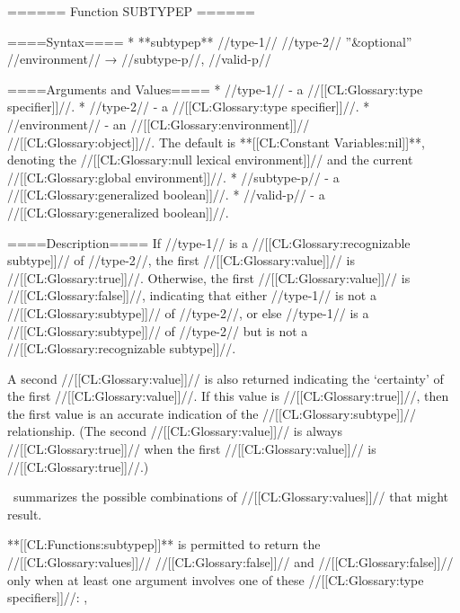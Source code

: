 ====== Function SUBTYPEP ======

====Syntax====
  * **subtypep** //type-1// //type-2// ''&optional'' //environment// → //subtype-p//, //valid-p//

====Arguments and Values====
  * //type-1// - a //[[CL:Glossary:type specifier]]//.
  * //type-2// - a //[[CL:Glossary:type specifier]]//.
  * //environment// - an //[[CL:Glossary:environment]]// //[[CL:Glossary:object]]//. The default is **[[CL:Constant Variables:nil]]**, denoting the //[[CL:Glossary:null lexical environment]]// and the current //[[CL:Glossary:global environment]]//.
  * //subtype-p// - a //[[CL:Glossary:generalized boolean]]//.
  * //valid-p// - a //[[CL:Glossary:generalized boolean]]//.

====Description====
If //type-1// is a //[[CL:Glossary:recognizable subtype]]// of //type-2//, the first //[[CL:Glossary:value]]// is //[[CL:Glossary:true]]//. Otherwise, the first //[[CL:Glossary:value]]// is //[[CL:Glossary:false]]//, indicating that either //type-1// is not a //[[CL:Glossary:subtype]]// of //type-2//, or else //type-1// is a //[[CL:Glossary:subtype]]// of //type-2// but is not a //[[CL:Glossary:recognizable subtype]]//.

A second //[[CL:Glossary:value]]// is also returned indicating the `certainty' of the first //[[CL:Glossary:value]]//. If this value is //[[CL:Glossary:true]]//, then the first value is an accurate indication of the //[[CL:Glossary:subtype]]// relationship. (The second //[[CL:Glossary:value]]// is always //[[CL:Glossary:true]]// when the first //[[CL:Glossary:value]]// is //[[CL:Glossary:true]]//.)

\Thenextfigure\ summarizes the possible combinations of //[[CL:Glossary:values]]// that might result.


**[[CL:Functions:subtypep]]** is permitted to return the //[[CL:Glossary:values]]// //[[CL:Glossary:false]]// and //[[CL:Glossary:false]]// only when at least one argument involves one of these //[[CL:Glossary:type specifiers]]//: ,

